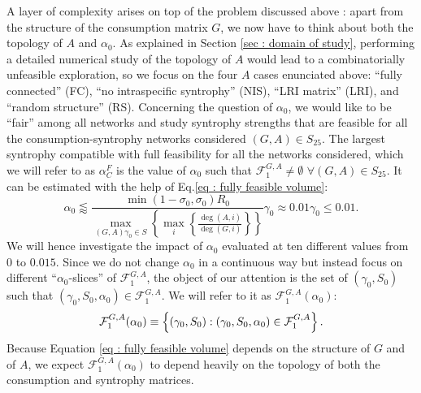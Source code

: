\documentclass[12pt, titlepage]{report}
\begin{document}
A layer of complexity arises on top of the problem discussed above%
: apart from the structure of the consumption matrix $G$, we now have to think about both the topology of $A$ and $\alpha_0$. As explained in Section \ref{sec : domain of study}, performing a detailed numerical study of the topology of $A$ would lead to a combinatorially unfeasible exploration, so we focus on the four $A$ cases enunciated above: ``fully connected'' (FC), ``no intraspecific syntrophy'' (NIS), ``LRI matrix'' (LRI), and ``random structure'' (RS). Concerning the question of $\alpha_0$, we would like to be ``fair'' among all networks and study syntrophy strengths that are feasible for all the consumption-syntrophy networks considered $(G,A) \in S_{25}$.
  The largest syntrophy compatible with full feasibility for all the networks considered, which we will refer to as  $\alpha_C^F$ is the value of $\alpha_0$ such that $\mathcal{F}^{G,A}_1 \neq \emptyset $ $\forall (G,A) \in S_{25}$. It can be estimated with the help of Eq.\eqref{eq : fully feasible volume}:
  \begin{equation}
  \alpha_0 \lessapprox \frac{\min(1-\sigma_0, \sigma_0)R_0}{\max_{(G,A) \gamma_0 \in S}\left\{\max_i\left\{\frac{\deg(A,i)}{\deg(G,i)}\right\}\right\}} \gamma_0 \approx 0.01 \gamma_0 \leq 0.01. \label{eq : results feasibility largest alpha0}
  \end{equation}
  We will hence investigate the impact of $\alpha_0$ evaluated at ten different values from $0$ to $0.015$. %
  Since we do not change $\alpha_0$ in a continuous way but instead focus on different ``$\alpha_0$-slices'' of $\mathcal{F}^{G,A}_1$, the object of our attention is the set of $(\gamma_0, S_0)$ such that $(\gamma_0, S_0, \alpha_0) \in \mathcal{F}^{G,A}_1$. We will refer to it as $\mathcal{F}^{G,A}_1(\alpha_0)$:
  \begin{equation}
  \mathcal{F}^{G,A}_1(\alpha_0) \equiv \left\{(\gamma_0, S_0) : (\gamma_0, S_0, \alpha_0) \in \mathcal{F}^{G,A}_1 \right\}.
  \end{equation}
  Because Equation \eqref{eq : fully feasible volume} depends on the structure of $G$ and of $A$, we expect $\mathcal{F}^{G,A}_1(\alpha_0)$ to depend heavily on the topology of both the consumption and syntrophy matrices.
\end{document}
